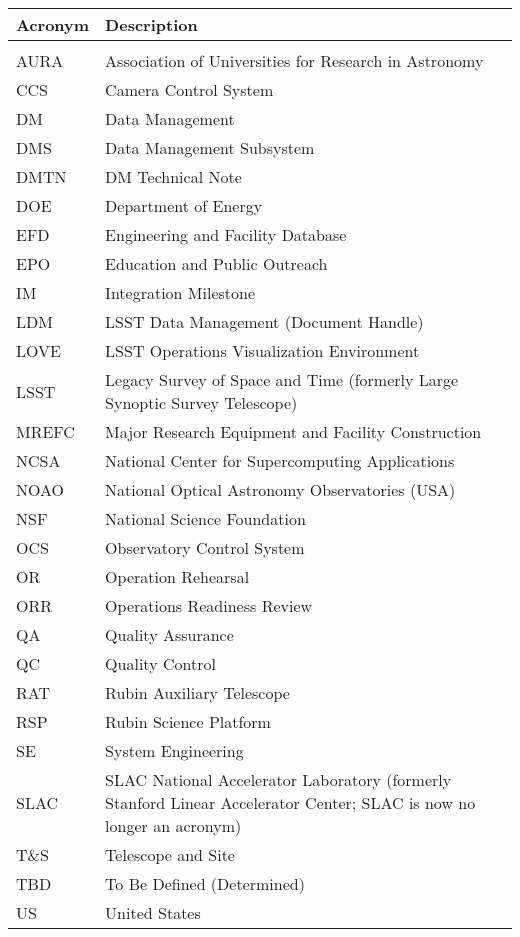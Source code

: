 \addtocounter{table}{-1}
\begin{longtable}{p{}p{}}\hline
\textbf{Acronym} & \textbf{Description}  \\\hline

 &  \\\hline
AURA & Association of Universities for Research in Astronomy \\\hline
CCS & Camera Control System \\\hline
DM & Data Management \\\hline
DMS & Data Management Subsystem \\\hline
DMTN & DM Technical Note \\\hline
DOE & Department of Energy \\\hline
EFD & Engineering and Facility Database \\\hline
EPO & Education and Public Outreach \\\hline
IM & Integration Milestone \\\hline
LDM & LSST Data Management (Document Handle) \\\hline
LOVE & LSST Operations Visualization Environment \\\hline
LSST & Legacy Survey of Space and Time (formerly Large Synoptic Survey Telescope) \\\hline
MREFC & Major Research Equipment and Facility Construction \\\hline
NCSA & National Center for Supercomputing Applications \\\hline
NOAO & National Optical Astronomy Observatories (USA) \\\hline
NSF & National Science Foundation \\\hline
OCS & Observatory Control System \\\hline
OR & Operation Rehearsal \\\hline
ORR & Operations Readiness Review \\\hline
QA & Quality Assurance \\\hline
QC & Quality Control \\\hline
RAT & Rubin Auxiliary Telescope \\\hline
RSP & Rubin Science Platform \\\hline
SE & System Engineering \\\hline
SLAC & SLAC National Accelerator Laboratory (formerly Stanford Linear Accelerator Center; SLAC is now no longer an acronym) \\\hline
T\&S & Telescope and Site \\\hline
TBD & To Be Defined (Determined) \\\hline
US & United States \\\hline
\end{longtable}
